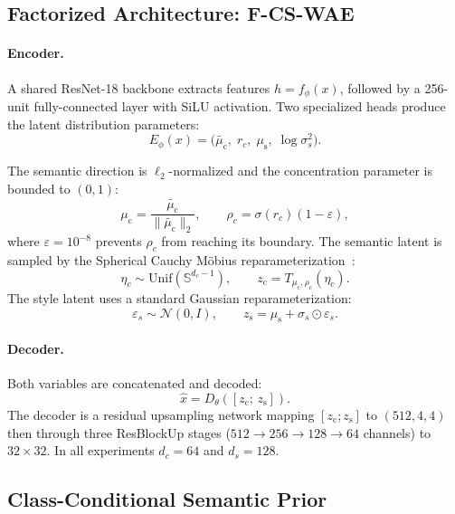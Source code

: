 \documentclass[10pt]{article}
\newcommand{\zc}{z_{\mathrm{c}}}
\newcommand{\zs}{z_{\mathrm{s}}}
\newcommand{\muc}{\mu_{\mathrm{c}}}
\newcommand{\mus}{\mu_{\mathrm{s}}}
\newcommand{\Sph}{\mathbb{S}}
\begin{document}
\subsection{Factorized Architecture: F-CS-WAE}

\paragraph{Encoder.}
A shared ResNet-18 backbone extracts features $h=f_\phi(x)$, followed by a
256-unit fully-connected layer with SiLU activation.
Two specialized heads produce the latent distribution parameters:
\begin{equation}
  E_\phi(x) = \bigl(\tilde{\muc},\;r_c,\;\mus,\;\log\sigma_s^2\bigr).
\end{equation}

The semantic direction is $\ell_2$-normalized and the concentration parameter is
bounded to $(0,1)$:
\begin{equation}
  \muc = \frac{\tilde{\muc}}{\|\tilde{\muc}\|_2},
  \qquad
  \rho_c = \sigma(r_c)(1-\varepsilon),
  \label{eq:semantic-head}
\end{equation}
where $\varepsilon=10^{-8}$ prevents $\rho_c$ from reaching its boundary.
The semantic latent is sampled by the Spherical Cauchy Möbius
reparameterization~\citep{sablica2025hyperspherical}:
\begin{equation}
  \eta_c\sim\mathrm{Unif}(\Sph^{d_c-1}),
  \qquad
  \zc = T_{\muc,\rho_c}(\eta_c).
  \label{eq:sc-reparam}
\end{equation}
The style latent uses a standard Gaussian reparameterization:
\begin{equation}
  \varepsilon_s\sim\mathcal{N}(0,I),
  \qquad
  \zs = \mus + \sigma_s \odot \varepsilon_s.
  \label{eq:style-reparam}
\end{equation}

\paragraph{Decoder.}
Both variables are concatenated and decoded:
\begin{equation}
  \hat{x} = D_\theta([\zc;\,\zs]).
  \label{eq:decoder}
\end{equation}
The decoder is a residual upsampling network mapping $[\zc;\zs]$ to $(512,4,4)$
then through three ResBlockUp stages ($512\to256\to128\to64$ channels) to $32\times32$.
In all experiments $d_c=64$ and $d_s=128$.

\subsection{Class-Conditional Semantic Prior}
\end{document}
